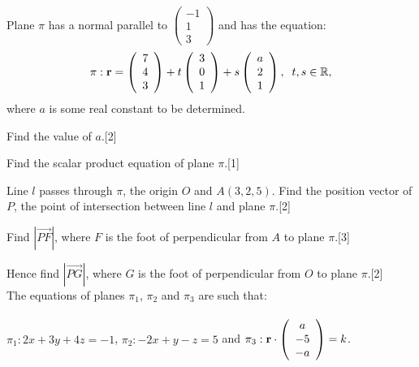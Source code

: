 \documentclass[12pt, a4 paper]{article}
\begin{document}
\begin{outline}[enumerate]
	\1 Plane $\pi $ has a normal parallel to $\left( {\begin{array}{*{20}{c}}{ - 1}\\1\\3\end{array}} \right)$ and has the equation:					
	\begin{align*}
		\pi :{\bf{r}} = \left( {\begin{array}{*{20}{c}}7 \\4\\3\end{array}} \right) + t\left( {\begin{array}{*{20}{c}}3\\0\\1\end{array}} \right) + s\left( {\begin{array}{*{20}{c}}a\\2\\1\end{array}} \right),\;\;t,s \in \mathbb{R},
	\end{align*}
	where $a$ is some real constant to be determined.
						
	\2 Find the value of $a$.\hfill[2]
	       					
	\2 Find the scalar product equation of plane $\pi $.\hfill[1]
					
	\2 Line ${l}$ passes through $\pi $, the origin $O$ and $A(3,2,5)$. Find the position vector of $P$, the point of intersection between line ${l}$ and plane $\pi $.\hfill[2]	
	    
	\2 Find $\left| {\overrightarrow {PF} } \right|$, where $F$ is the foot of perpendicular from $A$ to plane $\pi $.\hfill[3]
					
	\2 Hence find $\left| {\overrightarrow {PG} } \right|$, where $G$ is the foot of perpendicular from $O$ to plane $\pi $.\hfill[2]\\
					
	\1 The equations of planes ${\pi _1}$, ${\pi _2}$ and ${\pi _3}$ are such that: \\\\
	${\pi _1}:2x + 3y + 4z =  - 1$, \;\;  ${\pi _2}: - 2x + y - z = 5$ \;\;  and\;\;   ${\pi _3}:{\bf{r}} \cdot \left( {\begin{array}{*{20}{c}}a\\{ - 5}\\{ - a}\end{array}} \right) = k$.\\
						

\end{outline}
\end{document}
